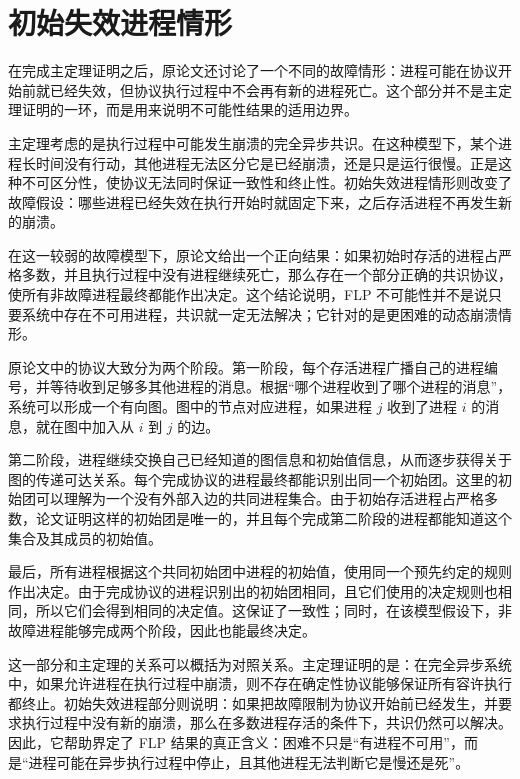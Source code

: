 \section{初始失效进程情形}

在完成主定理证明之后，原论文还讨论了一个不同的故障情形：进程可能在协议开始前就已经失效，但协议执行过程中不会再有新的进程死亡。这个部分并不是主定理证明的一环，而是用来说明不可能性结果的适用边界。

主定理考虑的是执行过程中可能发生崩溃的完全异步共识。在这种模型下，某个进程长时间没有行动，其他进程无法区分它是已经崩溃，还是只是运行很慢。正是这种不可区分性，使协议无法同时保证一致性和终止性。初始失效进程情形则改变了故障假设：哪些进程已经失效在执行开始时就固定下来，之后存活进程不再发生新的崩溃。

在这一较弱的故障模型下，原论文给出一个正向结果：如果初始时存活的进程占严格多数，并且执行过程中没有进程继续死亡，那么存在一个部分正确的共识协议，使所有非故障进程最终都能作出决定。这个结论说明，FLP 不可能性并不是说只要系统中存在不可用进程，共识就一定无法解决；它针对的是更困难的动态崩溃情形。

原论文中的协议大致分为两个阶段。第一阶段，每个存活进程广播自己的进程编号，并等待收到足够多其他进程的消息。根据“哪个进程收到了哪个进程的消息”，系统可以形成一个有向图。图中的节点对应进程，如果进程 $j$ 收到了进程 $i$ 的消息，就在图中加入从 $i$ 到 $j$ 的边。

第二阶段，进程继续交换自己已经知道的图信息和初始值信息，从而逐步获得关于图的传递可达关系。每个完成协议的进程最终都能识别出同一个初始团。这里的初始团可以理解为一个没有外部入边的共同进程集合。由于初始存活进程占严格多数，论文证明这样的初始团是唯一的，并且每个完成第二阶段的进程都能知道这个集合及其成员的初始值。

最后，所有进程根据这个共同初始团中进程的初始值，使用同一个预先约定的规则作出决定。由于完成协议的进程识别出的初始团相同，且它们使用的决定规则也相同，所以它们会得到相同的决定值。这保证了一致性；同时，在该模型假设下，非故障进程能够完成两个阶段，因此也能最终决定。

这一部分和主定理的关系可以概括为对照关系。主定理证明的是：在完全异步系统中，如果允许进程在执行过程中崩溃，则不存在确定性协议能够保证所有容许执行都终止。初始失效进程部分则说明：如果把故障限制为协议开始前已经发生，并要求执行过程中没有新的崩溃，那么在多数进程存活的条件下，共识仍然可以解决。因此，它帮助界定了 FLP 结果的真正含义：困难不只是“有进程不可用”，而是“进程可能在异步执行过程中停止，且其他进程无法判断它是慢还是死”。
